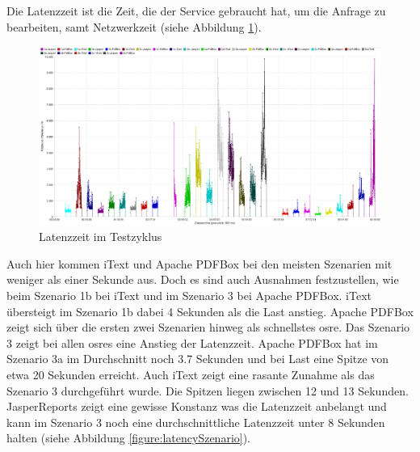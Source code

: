 \documentclass[main.tex]{subfiles}
\begin{document}
Die Latenzzeit ist die Zeit, die der Service gebraucht hat, um die Anfrage zu bearbeiten, samt Netzwerkzeit (siehe Abbildung \ref{figure:latencyTestcycle}). 


\begin{figure}[H]
\includegraphics[width=\textwidth]{mainpart/4_analyse_img/ResponseLatenciesOverTime.png}
 \caption{Latenzzeit im Testzyklus}
 \label{figure:latencyTestcycle}
\end{figure}




Auch hier kommen iText und Apache PDFBox bei den meisten Szenarien mit weniger als einer Sekunde aus. Doch es sind auch Ausnahmen festzustellen, wie beim Szenario 1b bei iText und im Szenario 3 bei Apache PDFBox. iText übersteigt im Szenario 1b dabei 4 Sekunden als die Last anstieg. Apache PDFBox zeigt sich über die ersten zwei Szenarien hinweg als schnellstes \acrshort{osre}. Das Szenario 3 zeigt bei allen \acrshort{osre}s eine Anstieg der Latenzzeit. Apache PDFBox hat im Szenario 3a im Durchschnitt noch 3.7 Sekunden und bei Last eine Spitze von etwa 20 Sekunden erreicht. Auch iText zeigt eine rasante Zunahme als das Szenario 3 durchgeführt wurde. Die Spitzen liegen zwischen 12 und 13 Sekunden. JasperReports zeigt eine gewisse Konstanz was die Latenzzeit anbelangt und kann im Szenario 3 noch eine durchschnittliche Latenzzeit unter 8 Sekunden halten (siehe  Abbildung \ref{figure:latencySzenario}).    

\end{document}
